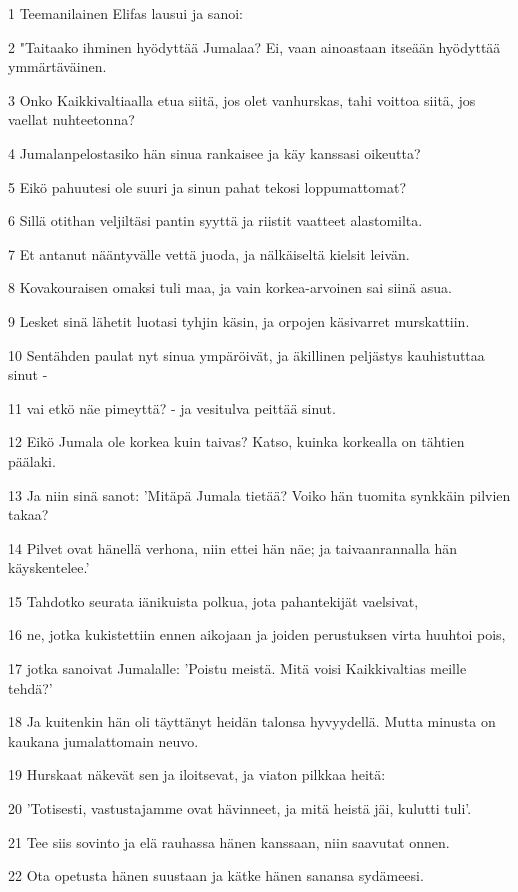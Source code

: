 \par 1 Teemanilainen Elifas lausui ja sanoi:
\par 2 "Taitaako ihminen hyödyttää Jumalaa? Ei, vaan ainoastaan itseään hyödyttää ymmärtäväinen.
\par 3 Onko Kaikkivaltiaalla etua siitä, jos olet vanhurskas, tahi voittoa siitä, jos vaellat nuhteetonna?
\par 4 Jumalanpelostasiko hän sinua rankaisee ja käy kanssasi oikeutta?
\par 5 Eikö pahuutesi ole suuri ja sinun pahat tekosi loppumattomat?
\par 6 Sillä otithan veljiltäsi pantin syyttä ja riistit vaatteet alastomilta.
\par 7 Et antanut nääntyvälle vettä juoda, ja nälkäiseltä kielsit leivän.
\par 8 Kovakouraisen omaksi tuli maa, ja vain korkea-arvoinen sai siinä asua.
\par 9 Lesket sinä lähetit luotasi tyhjin käsin, ja orpojen käsivarret murskattiin.
\par 10 Sentähden paulat nyt sinua ympäröivät, ja äkillinen peljästys kauhistuttaa sinut -
\par 11 vai etkö näe pimeyttä? - ja vesitulva peittää sinut.
\par 12 Eikö Jumala ole korkea kuin taivas? Katso, kuinka korkealla on tähtien päälaki.
\par 13 Ja niin sinä sanot: 'Mitäpä Jumala tietää? Voiko hän tuomita synkkäin pilvien takaa?
\par 14 Pilvet ovat hänellä verhona, niin ettei hän näe; ja taivaanrannalla hän käyskentelee.'
\par 15 Tahdotko seurata iänikuista polkua, jota pahantekijät vaelsivat,
\par 16 ne, jotka kukistettiin ennen aikojaan ja joiden perustuksen virta huuhtoi pois,
\par 17 jotka sanoivat Jumalalle: 'Poistu meistä. Mitä voisi Kaikkivaltias meille tehdä?'
\par 18 Ja kuitenkin hän oli täyttänyt heidän talonsa hyvyydellä. Mutta minusta on kaukana jumalattomain neuvo.
\par 19 Hurskaat näkevät sen ja iloitsevat, ja viaton pilkkaa heitä:
\par 20 'Totisesti, vastustajamme ovat hävinneet, ja mitä heistä jäi, kulutti tuli'.
\par 21 Tee siis sovinto ja elä rauhassa hänen kanssaan, niin saavutat onnen.
\par 22 Ota opetusta hänen suustaan ja kätke hänen sanansa sydämeesi.

